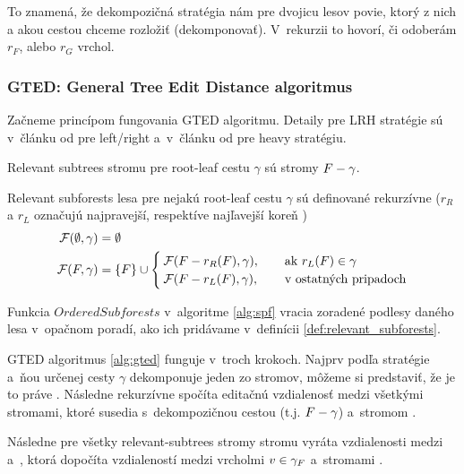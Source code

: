 To znamená, že dekompozičná stratégia nám pre dvojicu lesov povie,
ktorý z nich a akou cestou chceme rozložiť (dekomponovať).
V~rekurzii to hovorí, či odoberám $r_{F}$, alebo $r_{G}$ vrchol.




\subsubsection{GTED: General Tree Edit Distance algoritmus}

Začneme princípom fungovania GTED algoritmu. Detaily pre LRH stratégie sú
v~článku od \citet{ZHANGSHASHA} pre left/right a~v~článku od \citet{DMRW} pre heavy stratégiu.

\begin{definice}
  \label{def:relevant_subforests}
  Relevant subtrees stromu  pre root-leaf cestu $\gamma$ sú stromy $F - \gamma$.

  Relevant subforests lesa  pre nejakú root-leaf cestu $\gamma$ sú definované rekurzívne
  ($r_{R}$ a $r_{L}$ označujú najpravejší, respektíve najľavejší koreň )
	\begin{align*}
    \mathcal{F}(\emptyset, \gamma) &= \emptyset
		\\
    \mathcal{F}(F, \gamma) &= \{F\} \cup
		\begin{cases}
      \mathcal{F}(F - r_{R}(F), \gamma), \quad{} &\text{ak $r_{L}(F) \in \gamma$}
			\\
      \mathcal{F}(F - r_{L}(F), \gamma), &\text{v~ostatných pripadoch}
		\end{cases}
	\end{align*}
\end{definice}



\begin{pozn}
  Funkcia $OrderedSubforests$ v~algoritme \ref{alg:spf} vracia zoradené podlesy daného lesa
  v~opačnom poradí, ako ich pridávame v~definícii \ref{def:relevant_subforests}.
\end{pozn}

GTED algoritmus \ref{alg:gted} funguje v~troch krokoch.
Najprv podľa stratégie a~ňou určenej cesty $\gamma$ dekomponuje jeden zo stromov,
môžeme si predstaviť, že je to práve . Následne rekurzívne spočíta editačnú vzdialenosť
medzi všetkými stromami, ktoré susedia s~dekompozičnou cestou (t.j. $F - \gamma$) a~stromom .

Následne pre všetky relevant-subtrees stromy  stromu  vyráta vzdialenosti medzi 
a~, ktorá dopočíta vzdialeností medzi vrcholmi $v \in \gamma_{F}$ a~stromami .

